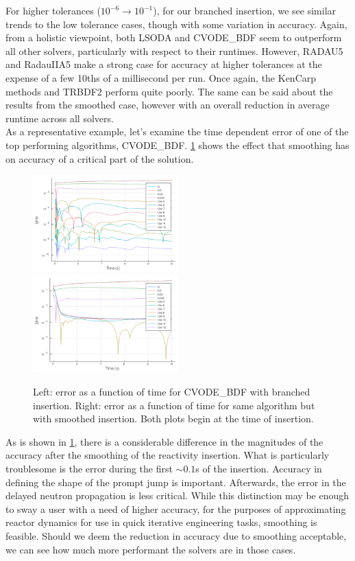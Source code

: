 \documentclass[review,onefignum,onetabnum]{siamart171218}
\begin{document}
For higher tolerances ($10^{-6} \rightarrow 10^{-1}$), for our branched insertion,
we see similar trends to the
low tolerance cases, though with some variation in accuracy. Again, from a holistic
viewpoint, both LSODA and CVODE\_BDF seem to outperform all other solvers, particularly with
respect to their runtimes. However, RADAU5 and RadauIIA5 make a strong case for accuracy at higher
tolerances at the expense of a few 10ths of a millisecond per run. Once again, the KenCarp methods
and TRBDF2 perform quite poorly. The same can be said about the results from the smoothed
case, however with an overall reduction in average runtime across all solvers. \\

As a representative example, let's examine the time dependent error of one of the top
performing algorithms, CVODE\_BDF. \cref{fig:timeseries-error} shows the effect
that smoothing has on accuracy of a critical part of the solution.\\

\begin{figure}[htb]
  \includegraphics[width=0.5\textwidth]{../plots/timeseries-error/CVODE_BDF.png}
  \includegraphics[width=0.5\textwidth]{../plots/timeseries-error/CVODE_BDF-tanh.png}
  \caption{Left: error as a function of time for CVODE\_BDF with branched insertion.
  Right: error as a function of time for same algorithm but with smoothed insertion. Both
  plots begin at the time of insertion.}
  \label{fig:timeseries-error}
\end{figure}

As is shown in \cref{fig:timeseries-error}, there is a considerable difference in
the magnitudes of the accuracy after the smoothing of the reactivity insertion.
What is particularly troublesome is the error during the first $\sim 0.1$s of the
insertion. Accuracy in defining the shape of the prompt jump is important. Afterwards,
the error in the delayed neutron propagation is less critical. While this distinction
may be enough to sway a user with a need of higher accuracy, for the purposes of
approximating reactor dynamics for use in quick iterative engineering tasks, smoothing
is feasible. Should we deem the reduction in accuracy due to smoothing acceptable,
we can see how much more performant the solvers are in those cases.\\
\end{document}
